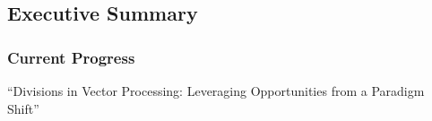 \graphicspath{{../../../PhD/paper_factory/thesis_louis/Chapter6/Figs/}}
\subsection{Executive Summary}
\begin{frame}
    \frametitle{Current Progress}

    \centering
    \huge ``Divisions in Vector Processing: Leveraging Opportunities from a Paradigm Shift''
    \normalsize

    \vspace{1em} %

    \tableofcontents[currentsection,
                     subsectionstyle=show/shaded/hide,
                     sectionstyle=show/hide]

\end{frame}

%
%
%
%

